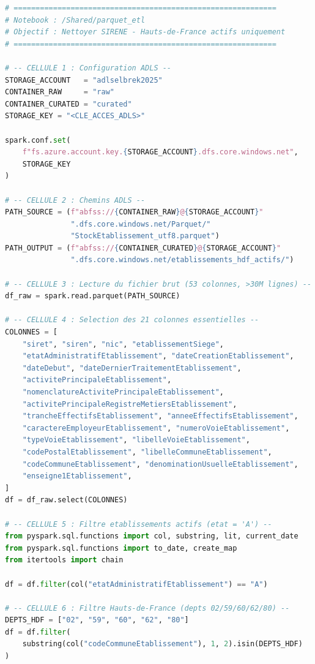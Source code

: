 \documentclass[12pt,a4paper]{article}
\begin{document}
\begin{lstlisting}[language=Python]
# ============================================================
# Notebook : /Shared/parquet_etl
# Objectif : Nettoyer SIRENE - Hauts-de-France actifs uniquement
# ============================================================

# -- CELLULE 1 : Configuration ADLS --
STORAGE_ACCOUNT   = "adlselbrek2025"
CONTAINER_RAW     = "raw"
CONTAINER_CURATED = "curated"
STORAGE_KEY = "<CLE_ACCES_ADLS>"

spark.conf.set(
    f"fs.azure.account.key.{STORAGE_ACCOUNT}.dfs.core.windows.net",
    STORAGE_KEY
)

# -- CELLULE 2 : Chemins ADLS --
PATH_SOURCE = (f"abfss://{CONTAINER_RAW}@{STORAGE_ACCOUNT}"
               ".dfs.core.windows.net/Parquet/"
               "StockEtablissement_utf8.parquet")
PATH_OUTPUT = (f"abfss://{CONTAINER_CURATED}@{STORAGE_ACCOUNT}"
               ".dfs.core.windows.net/etablissements_hdf_actifs/")

# -- CELLULE 3 : Lecture du fichier brut (53 colonnes, >30M lignes) --
df_raw = spark.read.parquet(PATH_SOURCE)

# -- CELLULE 4 : Selection des 21 colonnes essentielles --
COLONNES = [
    "siret", "siren", "nic", "etablissementSiege",
    "etatAdministratifEtablissement", "dateCreationEtablissement",
    "dateDebut", "dateDernierTraitementEtablissement",
    "activitePrincipaleEtablissement",
    "nomenclatureActivitePrincipaleEtablissement",
    "activitePrincipaleRegistreMetiersEtablissement",
    "trancheEffectifsEtablissement", "anneeEffectifsEtablissement",
    "caractereEmployeurEtablissement", "numeroVoieEtablissement",
    "typeVoieEtablissement", "libelleVoieEtablissement",
    "codePostalEtablissement", "libelleCommuneEtablissement",
    "codeCommuneEtablissement", "denominationUsuelleEtablissement",
    "enseigne1Etablissement",
]
df = df_raw.select(COLONNES)

# -- CELLULE 5 : Filtre etablissements actifs (etat = 'A') --
from pyspark.sql.functions import col, substring, lit, current_date
from pyspark.sql.functions import to_date, create_map
from itertools import chain

df = df.filter(col("etatAdministratifEtablissement") == "A")

# -- CELLULE 6 : Filtre Hauts-de-France (depts 02/59/60/62/80) --
DEPTS_HDF = ["02", "59", "60", "62", "80"]
df = df.filter(
    substring(col("codeCommuneEtablissement"), 1, 2).isin(DEPTS_HDF)
)


\end{lstlisting}
\end{document}
